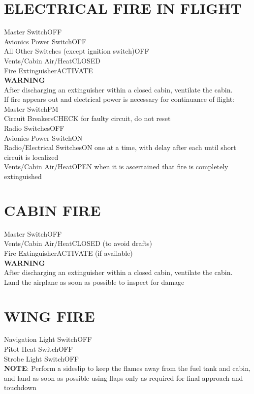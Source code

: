 \documentclass{article}
\begin{document}
\begin{multicols*}{2}
\section*{ELECTRICAL FIRE IN FLIGHT}
Master Switch\dotfill OFF\\
Avionics Power Switch\dotfill OFF\\
All Other Switches (except ignition switch)\dotfill OFF\\
Vents/Cabin Air/Heat\dotfill CLOSED\\
Fire Extinguisher\dotfill ACTIVATE\\
\centering \textbf{WARNING}\\
After discharging an extinguisher within a closed cabin, ventilate the cabin.\\
If fire appears out and electrical power is necessary for continuance of flight:\\
Master Switch\dotfill PM\\
Circuit Breakers\dotfill CHECK for faulty circuit, do not reset\\
Radio Switches\dotfill OFF\\
Avionics Power Switch\dotfill ON\\
Radio/Electrical Switches\dotfill ON one at a time, with delay after each until short circuit is localized\\
Vents/Cabin Air/Heat\dotfill OPEN when it is ascertained that fire is completely extinguished
\section*{CABIN FIRE}
Master Switch\dotfill OFF\\
Vents/Cabin Air/Heat\dotfill CLOSED (to avoid drafts)\\
Fire Extinguisher\dotfill ACTIVATE (if available)\\
\centering \textbf{WARNING}\\
After discharging an extinguisher within a closed cabin, ventilate the cabin.\\
Land the airplane as soon as possible to inspect for damage
\section*{WING FIRE}
Navigation Light Switch\dotfill OFF\\
Pitot Heat Switch\dotfill OFF\\
Strobe Light Switch\dotfill OFF\\
\centering \textbf{NOTE}:
Perform a sideslip to keep the flames away from the fuel tank and cabin, and land as soon as possible using flaps only as required for final approach and touchdown

\end{multicols*}
\end{document}
